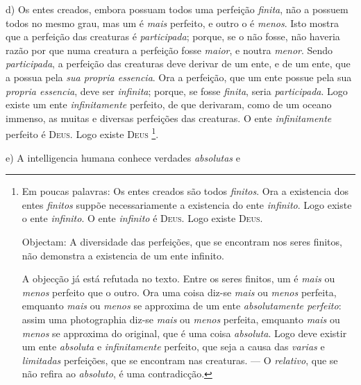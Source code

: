  d) Os entes creados, embora possuam todos uma perfeição \emph{finita}, não a possuem todos no mesmo grau, mas um é \emph{mais} perfeito, e outro o é \emph{menos}. Isto mostra que a perfeição das creaturas é \emph{participada}; porque, se o não fosse, não haveria razão por que numa creatura a perfeição fosse \emph{maior}, e noutra \emph{menor}. Sendo \emph{participada}, a perfeição das creaturas deve derivar de um ente, e de um ente, que a possua pela \emph{sua propria essencia}. Ora a perfeição, que um ente possue pela sua \emph{propria essencia}, deve ser \emph{infinita}; porque, se fosse \emph{finita}, seria \emph{participada}. Logo existe um ente \emph{infinitamente} perfeito, de que derivaram, como de um oceano immenso, as muitas e diversas perfeições das creaturas. O ente \emph{infinitamente} perfeito é \textsc{Deus}. Logo existe \textsc{Deus} \footnote{Em poucas palavras: Os entes creados são todos \emph{finitos}. Ora a existencia dos entes \emph{finitos} suppõe necessariamente a existencia do ente \emph{infinito}. Logo existe o ente \emph{infinito}. O ente \emph{infinito} é \textsc{Deus}. Logo existe \textsc{Deus}.\par Objectam: A diversidade das perfeições, que se encontram nos seres finitos, não demonstra a existencia de um ente infinito.\par A objecção já está refutada no texto. Entre os seres finitos, um é \emph{mais} ou \emph{menos} perfeito que o outro. Ora uma coisa diz-se \emph{mais} ou \emph{menos} perfeita, emquanto \emph{mais} ou \emph{menos} se approxima de um ente \emph{absolutamente perfeito}: assim uma photographia diz-se \emph{mais} ou \emph{menos} perfeita, emquanto \emph{mais} ou \emph{menos} se approxima do original, que é uma coisa \emph{absoluta}. Logo deve existir um ente \emph{absoluta} e \emph{infinitamente} perfeito, que seja a causa das \emph{varias} e \emph{limitadas} perfeições, que se encontram nas creaturas. --- O \emph{relativo}, que se não refira ao \emph{absoluto}, é uma contradicção.}.

e) A intelligencia humana conhece verdades \emph{absolutas} e

